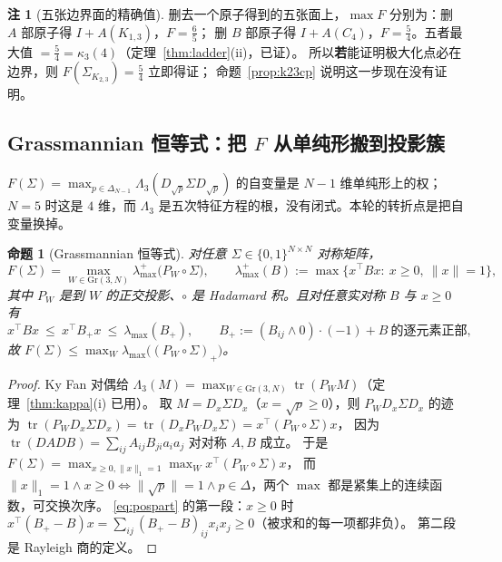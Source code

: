 \documentclass[UTF8,11pt]{ctexart}
\newtheorem{proposition}[theorem]{命题}
\theoremstyle{definition}
\newtheorem{remark}[theorem]{注}
\newcommand{\Lam}{\Lambda}
\newcommand{\tr}{\operatorname{tr}}
\begin{document}
\begin{remark}[五张边界面的精确值]\label{rmk:faces}
删去一个原子得到的五张面上，$\max F$ 分别为：删 $A$ 部原子得 $I+A(K_{1,3})$，$F=\frac65$；
删 $B$ 部原子得 $I+A(C_4)$，$F=\frac54$。五者最大值 $=\frac54=\kappa_3(4)$（定理~\ref{thm:ladder}(ii)，已证）。
所以\textbf{若}能证明极大化点必在边界，则 $F(\Sigma_{K_{2,3}})=\frac54$ 立即得证；
命题~\ref{prop:k23cp} 说明这一步现在没有证明。
\end{remark}


\subsection{Grassmannian 恒等式：把 $F$ 从单纯形搬到投影簇}\label{sec:frame}

$F(\Sigma)=\max_{p\in\Delta_{N-1}}\Lam_3(D_{\sqrt p}\Sigma D_{\sqrt p})$ 的自变量是 $N-1$ 维单纯形上的权；
$N=5$ 时这是 $4$ 维，而 $\Lam_3$ 是五次特征方程的根，没有闭式。本轮的转折点是把自变量换掉。

\begin{proposition}[Grassmannian 恒等式]\label{prop:grassid}
对任意 $\Sigma\in\{0,1\}^{N\times N}$ 对称矩阵，
\begin{equation}\label{eq:grassid}
F(\Sigma)=\max_{W\in\mathrm{Gr}(3,N)}\lambda_{\max}^{+}\bigl(P_W\circ\Sigma\bigr),\qquad
\lambda_{\max}^{+}(B):=\max\{x^\top Bx:\ x\ge0,\ \|x\|=1\},
\end{equation}
其中 $P_W$ 是到 $W$ 的正交投影、$\circ$ 是 Hadamard 积。且对任意实对称 $B$ 与 $x\ge0$ 有
\begin{equation}\label{eq:pospart}
x^\top Bx\ \le\ x^\top B_+x\ \le\ \lambda_{\max}(B_+),\qquad B_+:=(B_{ij}\wedge0)\cdot(-1)+B\ \text{的逐元素正部},
\end{equation}
故 $F(\Sigma)\le\max_{W}\lambda_{\max}\bigl((P_W\circ\Sigma)_+\bigr)$。
\end{proposition}

\begin{proof}
Ky Fan 对偶给 $\Lam_3(M)=\max_{W\in\mathrm{Gr}(3,N)}\tr(P_WM)$（定理~\ref{thm:kappa}(i) 已用）。
取 $M=D_x\Sigma D_x$（$x=\sqrt p\ge0$），则 $P_WD_x\Sigma D_x$ 的迹为
$\tr(P_WD_x\Sigma D_x)=\tr(D_xP_WD_x\Sigma)=x^\top(P_W\circ\Sigma)x$，
因为 $\tr(DADB)=\sum_{ij}A_{ij}B_{ji}a_ia_j$ 对对称 $A,B$ 成立。
于是 $F(\Sigma)=\max_{x\ge0,\|x\|_1=1}\max_W x^\top(P_W\circ\Sigma)x$，
而 $\|x\|_1=1\wedge x\ge0\iff\|\sqrt p\|=1\wedge p\in\Delta$，两个 $\max$ 都是紧集上的连续函数，可交换次序。
\eqref{eq:pospart} 的第一段：$x\ge0$ 时 $x^\top(B_+-B)x=\sum_{ij}(B_+-B)_{ij}x_ix_j\ge0$（被求和的每一项都非负）。
第二段是 Rayleigh 商的定义。
\end{proof}
\end{document}
